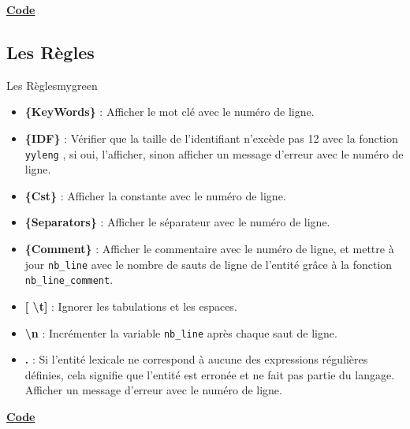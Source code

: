 \vspace{1cm}
\textbf{\underline{Code}}

\vspace{0.25cm}



\newpage


\subsection{Les Règles}
\begin{prettyBox}{Les Règles}{mygreen}
    \begin{itemize}
        \item \textbf{\{KeyWords\} } : Afficher le mot clé avec le numéro de ligne.
        \item \textbf{\{IDF\} } : Vérifier que la taille de l'identifiant n'excède pas 12 avec la fonction \texttt{yyleng} , si oui, l'afficher, sinon afficher un message d'erreur avec le numéro de ligne.
        \item \textbf{\{Cst\} } : Afficher la constante avec le numéro de ligne.
        \item \textbf{\{Separators\} } : Afficher le séparateur avec le numéro de ligne.
        \item \textbf{\{Comment\} } : Afficher le commentaire avec le numéro de ligne, et mettre à jour \texttt{nb\_line} avec le nombre de sauts de ligne de l'entité grâce à la fonction \texttt{nb\_line\_comment}.
        \item \textbf{[ \textbackslash t] } : Ignorer les tabulations et les espaces.
        \item \textbf{\textbackslash n } : Incrémenter la variable \texttt{nb\_line} après chaque saut de ligne.
        \item \textbf{.} : Si l'entité lexicale ne correspond à aucune des expressions régulières définies, cela signifie que l'entité est erronée et ne fait pas partie du langage. Afficher un message d'erreur avec le numéro de ligne.
    \end{itemize}
\end{prettyBox}
\vspace{1cm}

\textbf{\underline{Code}}

\vspace{0.25cm}


